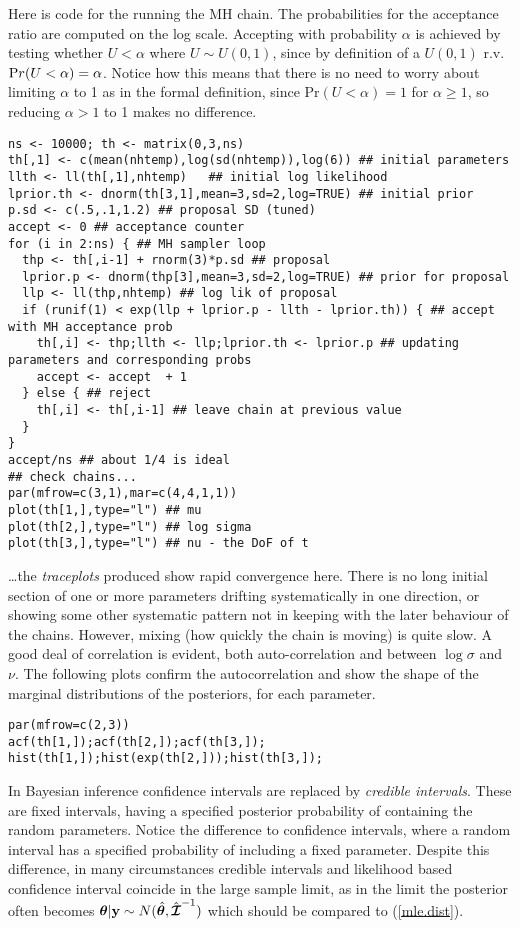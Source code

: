 \documentclass[10pt] {article}
\newcommand{\eps}[3]
{{\begin{center}
 \rotatebox{#1}{\scalebox{#2}{\texttt{[image: \#3]}}}
 \end{center}}
}
\theoremstyle{definition}
\begin{document}
Here is code for the running the MH chain. The probabilities for the acceptance ratio are computed on the log scale. Accepting with probability $\alpha$ is achieved by testing whether $U<\alpha$ where $U\sim U(0,1)$, since by definition of a $U(0,1)$ r.v. ${\text Pr}(U<\alpha) = \alpha$. Notice how this means that there is no need to worry about limiting $\alpha$ to 1 as in the formal definition, since $\text{Pr}(U<\alpha) = 1$ for $\alpha\ge 1$, so reducing $\alpha>1$ to 1 makes no difference.  
\begin{lstlisting}
ns <- 10000; th <- matrix(0,3,ns)
th[,1] <- c(mean(nhtemp),log(sd(nhtemp)),log(6)) ## initial parameters
llth <- ll(th[,1],nhtemp)   ## initial log likelihood
lprior.th <- dnorm(th[3,1],mean=3,sd=2,log=TRUE) ## initial prior
p.sd <- c(.5,.1,1.2) ## proposal SD (tuned)
accept <- 0 ## acceptance counter
for (i in 2:ns) { ## MH sampler loop
  thp <- th[,i-1] + rnorm(3)*p.sd ## proposal
  lprior.p <- dnorm(thp[3],mean=3,sd=2,log=TRUE) ## prior for proposal
  llp <- ll(thp,nhtemp) ## log lik of proposal
  if (runif(1) < exp(llp + lprior.p - llth - lprior.th)) { ## accept with MH acceptance prob
    th[,i] <- thp;llth <- llp;lprior.th <- lprior.p ## updating parameters and corresponding probs
    accept <- accept  + 1
  } else { ## reject 
    th[,i] <- th[,i-1] ## leave chain at previous value
  }
}
accept/ns ## about 1/4 is ideal
## check chains...
par(mfrow=c(3,1),mar=c(4,4,1,1))
plot(th[1,],type="l") ## mu
plot(th[2,],type="l") ## log sigma
plot(th[3,],type="l") ## nu - the DoF of t
\end{lstlisting}
\eps{-90}{.4}{chains.eps}
\ldots the {\em traceplots} produced show rapid convergence here. There is no long initial section of one or more parameters drifting systematically in one direction, or showing some other systematic pattern not in keeping with the later behaviour of the chains. However, mixing (how quickly the chain is moving) is quite slow. A good deal of correlation is evident, both auto-correlation and between $\log \sigma$ and $\nu$. The following plots confirm the autocorrelation and  show the shape of the marginal distributions of the posteriors, for each parameter.
\begin{lstlisting}
par(mfrow=c(2,3))
acf(th[1,]);acf(th[2,]);acf(th[3,]);
hist(th[1,]);hist(exp(th[2,]));hist(th[3,]);
\end{lstlisting}
\eps{-90}{.4}{acf-hist.eps}
In Bayesian inference confidence intervals are replaced by {\em credible intervals}. These are fixed intervals, having a specified posterior probability of containing the random parameters. Notice the difference to confidence intervals, where a random interval has a specified probability of including a fixed parameter. Despite this difference, in many circumstances credible intervals and likelihood based confidence interval coincide in the large sample limit, as in the limit the posterior often becomes ${\bm \theta}|{\bf y} \sim N(\hat {\bm \theta},\hat{\bm{{\cal I}}}^{-1})$ which should be compared to (\ref{mle.dist}). 
\end{document}
